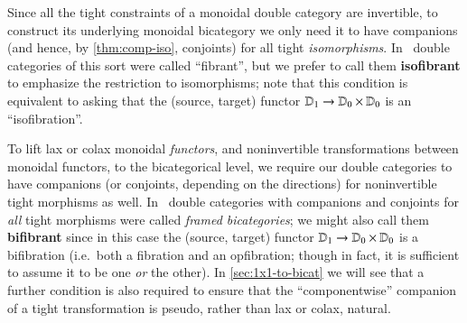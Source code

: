 \begin{rmk}
  Since all the tight constraints of a monoidal double category are invertible, to construct its underlying monoidal bicategory we only need it to have companions (and hence, by \cref{thm:comp-iso}, conjoints) for all tight \emph{isomorphisms}.
  In~\cite{gg:ldstr-tricat} double categories of this sort were called ``fibrant'', but we prefer to call them \textbf{isofibrant} to emphasize the restriction to isomorphisms; note that this condition is equivalent to asking that the (source, target) functor $\mathbb{D}_1 \to \mathbb{D}_0\times\mathbb{D}_0$ is an ``isofibration''.
  
  To lift lax or colax monoidal \emph{functors}, and noninvertible transformations between monoidal functors, to the bicategorical level, we require our double categories to have companions (or conjoints, depending on the directions) for noninvertible tight morphisms as well.
  In~\cite{shulman:frbi} double categories with companions and conjoints for \emph{all} tight morphisms were called \emph{framed bicategories}; we might also call them \textbf{bifibrant} since in this case the (source, target) functor $\mathbb{D}_1 \to \mathbb{D}_0\times\mathbb{D}_0$ is a bifibration (i.e.\ both a fibration and an opfibration; though in fact, it is sufficient to assume it to be one \emph{or} the other).
  In \cref{sec:1x1-to-bicat} we will see that a further condition is also required to ensure that the ``componentwise'' companion of a tight transformation is pseudo, rather than lax or colax, natural.
\end{rmk}



